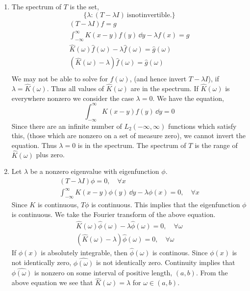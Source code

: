 \begin{Solution}
  \begin{enumerate}
  \item
    The spectrum of $T$ is the set,
    \[
    \{ \lambda : (T - \lambda I)\ \mathrm{is not invertible}. \}
    \]
    \begin{gather*}
      (T - \lambda I) f = g \\
      \int_{-\infty}^\infty K(x - y) f(y) \,\dd y - \lambda f(x) = g \\
      \hat{K}(\omega) \hat{f}(\omega) - \lambda \hat{f}(\omega) = \hat{g}(\omega) \\
      \left( \hat{K}(\omega) - \lambda \right) \hat{f}(\omega) = \hat{g}(\omega) \\
    \end{gather*}
    We may not be able to solve for $\hat{f}(\omega)$, (and hence invert
    $T - \lambda I$), if $\lambda = \hat{K}(\omega)$.  Thus all values of 
    $\hat{K}(\omega)$ are in the spectrum.  If $\hat{K}(\omega)$ is everywhere
    nonzero we consider the case $\lambda = 0$.  We have the equation,
    \[
    \int_{-\infty}^\infty K(x - y) f(y) \,\dd y = 0 
    \]
    Since there are an infinite number of $L_2(-\infty,\infty)$ functions 
    which satisfy this, (those which are nonzero on a set of measure zero),
    we cannot invert the equation.  Thus $\lambda = 0$ is in the spectrum.
    The spectrum of $T$ is the range of $\hat{K}(\omega)$ plus zero.
  \item
    Let $\lambda$ be a nonzero eigenvalue with eigenfunction $\phi$.
    \begin{gather*}
      (T - \lambda I) \phi = 0, \quad \forall x \\
      \int_{-\infty}^\infty K(x - y) \phi(y) \,\dd y - \lambda \phi(x) = 0, \quad \forall x 
    \end{gather*}
    Since $K$ is continuous, $T \phi$ is continuous.  This implies that the 
    eigenfunction $\phi$ is continuous.  We take the Fourier transform of the
    above equation.
    \begin{gather*}
      \hat{K}(\omega) \hat{\phi}(\omega) - \lambda \hat{\phi}(\omega) = 0, \quad
      \forall \omega \\
      \left( \hat{K}(\omega) - \lambda \right) \hat{\phi}(\omega) = 0, \quad
      \forall \omega 
    \end{gather*}
    If $\phi(x)$ is absolutely integrable, then $\hat{\phi}(\omega)$ is continous.
    Since $\phi(x)$ is not identically zero, $\hat{\phi(\omega)}$ is not
    identically zero.  Continuity implies that $\hat{\phi(\omega)}$ is nonzero
    on some interval of positive length, $(a,b)$.  From the above equation 
    we see that $\hat{K}(\omega) = \lambda$ for $\omega \in (a,b)$.


\end{enumerate}
\end{Solution}

